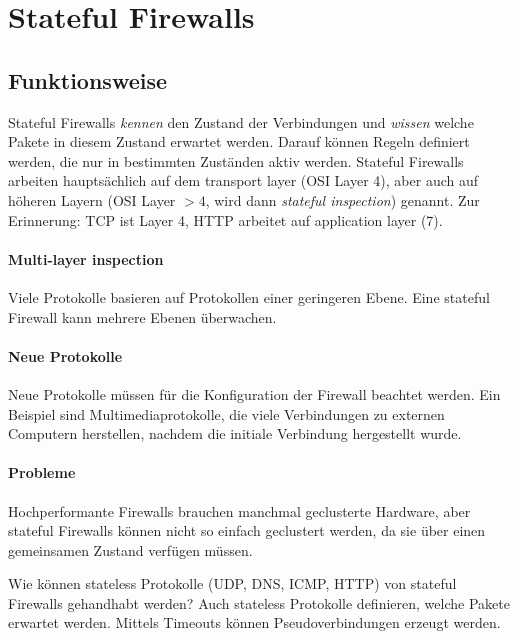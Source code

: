 \section{Stateful Firewalls}%
\label{sec:stateful_firewalls}

\subsection{Funktionsweise}%

Stateful Firewalls \emph{kennen} den Zustand der Verbindungen und \emph{wissen} welche
Pakete in diesem Zustand erwartet werden.
Darauf können Regeln definiert werden, die nur in bestimmten Zuständen aktiv werden.
Stateful Firewalls arbeiten hauptsächlich auf dem transport layer (OSI Layer 4), aber auch
auf höheren Layern (OSI Layer $> 4$, wird dann \emph{stateful inspection}) genannt.
Zur Erinnerung: TCP ist Layer 4, HTTP arbeitet auf application layer (7).

\paragraph{Multi-layer inspection}%

Viele Protokolle basieren auf Protokollen einer geringeren Ebene.
Eine stateful Firewall kann mehrere Ebenen überwachen.

\paragraph{Neue Protokolle}%

Neue Protokolle müssen für die Konfiguration der Firewall beachtet werden.
Ein Beispiel sind Multimediaprotokolle, die viele Verbindungen zu externen Computern
herstellen, nachdem die initiale Verbindung hergestellt wurde.

\paragraph{Probleme}%

Hochperformante Firewalls brauchen manchmal geclusterte Hardware, aber stateful Firewalls
können nicht so einfach geclustert werden, da sie über einen gemeinsamen Zustand verfügen
müssen.

Wie können stateless Protokolle (UDP, DNS, ICMP, HTTP) von stateful Firewalls
gehandhabt werden?
Auch stateless Protokolle definieren, welche Pakete erwartet werden.
Mittels Timeouts können Pseudoverbindungen erzeugt werden.
